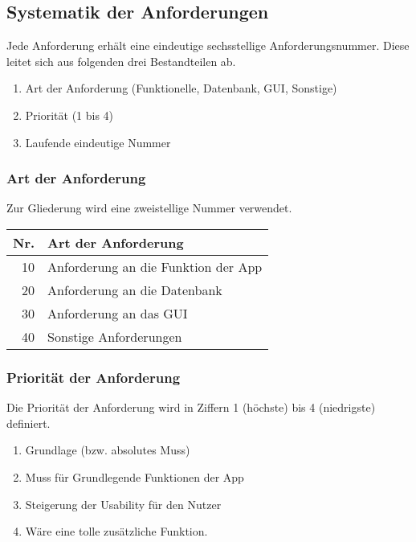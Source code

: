 \subsection{Systematik der Anforderungen}

Jede Anforderung erhält eine eindeutige sechsstellige Anforderungsnummer. Diese leitet sich aus folgenden drei Bestandteilen ab.

\begin{enumerate}
	\item Art der Anforderung (Funktionelle, Datenbank, GUI, Sonstige)
	\item Priorität (1 bis 4)
	\item Laufende eindeutige Nummer
\end{enumerate} 

\subsubsection{Art der Anforderung}

Zur Gliederung wird eine zweistellige Nummer verwendet.

\begin{table} [htbp]
	\begin{tabular}{r|l}
		\textbf{Nr.} & \textbf{Art der Anforderung} \\ \hline
		10 & Anforderung an die Funktion der App \\
		\rowcolor{DarkSeaGreen} 20 & Anforderung an die Datenbank \\
		30 & Anforderung an das GUI \\
		\rowcolor{DarkSeaGreen} 40 & Sonstige Anforderungen
	\end{tabular}
\end{table}

\subsubsection{Priorität der Anforderung}

Die Priorität der Anforderung wird in Ziffern 1 (höchste) bis 4 (niedrigste) definiert.

\begin{enumerate}
	\item Grundlage (bzw. absolutes Muss)
	\item Muss für Grundlegende Funktionen der App
	\item Steigerung der Usability für den Nutzer
	\item Wäre eine tolle zusätzliche Funktion.
\end{enumerate}

